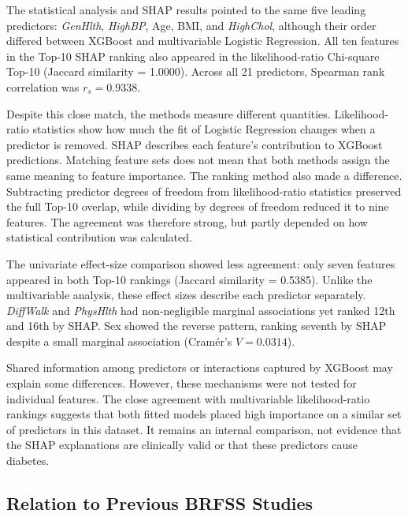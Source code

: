 \documentclass[pdflatex,sn-basic,Numbered]{sn-jnl}
\begin{document}
The statistical analysis and SHAP results pointed to the same five leading predictors: \textit{GenHlth}, \textit{HighBP}, Age, BMI, and \textit{HighChol}, although their order differed between XGBoost and multivariable Logistic Regression. All ten features in the Top-10 SHAP ranking also appeared in the likelihood-ratio Chi-square Top-10 (Jaccard similarity = 1.0000). Across all 21 predictors, Spearman rank correlation was $r_s=0.9338$.

Despite this close match, the methods measure different quantities. Likelihood-ratio statistics show how much the fit of Logistic Regression changes when a predictor is removed. SHAP describes each feature's contribution to XGBoost predictions. Matching feature sets does not mean that both methods assign the same meaning to feature importance. The ranking method also made a difference. Subtracting predictor degrees of freedom from likelihood-ratio statistics preserved the full Top-10 overlap, while dividing by degrees of freedom reduced it to nine features. The agreement was therefore strong, but partly depended on how statistical contribution was calculated.

The univariate effect-size comparison showed less agreement: only seven features appeared in both Top-10 rankings (Jaccard similarity = 0.5385). Unlike the multivariable analysis, these effect sizes describe each predictor separately. \textit{DiffWalk} and \textit{PhysHlth} had non-negligible marginal associations yet ranked 12th and 16th by SHAP. Sex showed the reverse pattern, ranking seventh by SHAP despite a small marginal association (Cram{\'e}r's $V=0.0314$).

Shared information among predictors or interactions captured by XGBoost may explain some differences. However, these mechanisms were not tested for individual features. The close agreement with multivariable likelihood-ratio rankings suggests that both fitted models placed high importance on a similar set of predictors in this dataset. It remains an internal comparison, not evidence that the SHAP explanations are clinically valid or that these predictors cause diabetes.




\subsection{Relation to Previous BRFSS Studies}
\label{subsec:literature_discussion}
\end{document}
